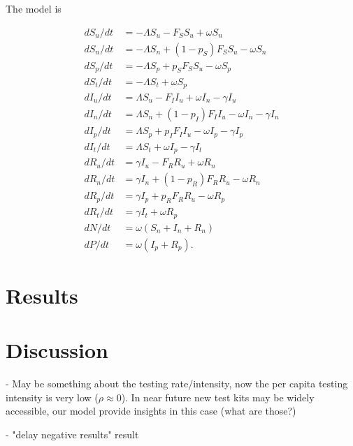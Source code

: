 \documentclass{article}
\begin{document}
The model is

\begin{align}
\label{model}
 d S_u/dt &= -\Lambda S_u - F_S S_u + \omega S_n \\
 d S_n/dt &= -\Lambda S_n + (1-p_S) F_S S_u - \omega S_n \\
 d S_p/dt &= -\Lambda S_p + p_S F_S S_u - \omega S_p \\
 d S_t/dt &= -\Lambda S_t + \omega S_p \\
 d I_u/dt &= \Lambda S_u - F_I I_u + \omega I_n  - \gamma I_u  \\
 d I_n/dt &= \Lambda S_n + (1-p_I) F_I I_u - \omega I_n -\gamma I_n \\
 d I_p/dt &= \Lambda S_p + p_I F_I I_u - \omega I_p -\gamma I_p \\
 d I_t/dt &= \Lambda S_t + \omega I_p - \gamma I_t  \\
 d R_u/dt &= \gamma I_u - F_R R_u + \omega R_n \\
 d R_n/dt &= \gamma I_n + (1-p_R) F_R R_u - \omega R_n  \\
 d R_p/dt &= \gamma I_p + p_R F_R R_u  - \omega R_p  \\
 d R_t/dt&= \gamma I_t + \omega R_p  \\
 dN/dt &= \omega (S_n + I_n + R_n)   \\
 dP/dt &= \omega(I_p + R_p).
\end{align}

\section{Results}


\section{Discussion}

- May be something about the testing rate/intensity, now the per capita testing intensity is very low ($\rho \approx 0$). In near future new test kits may be widely accessible, our model provide insights in this case (what are those?)

- "delay negative results" result



\end{document}
